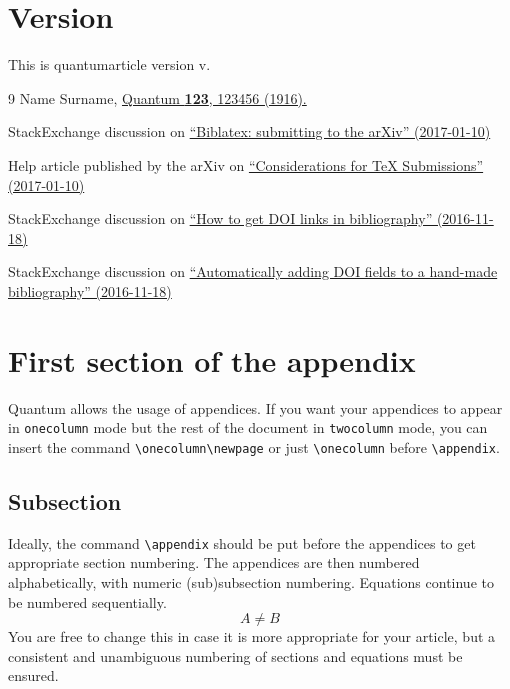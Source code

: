 \documentclass[a4paper,twocolumn,11pt]{quantumarticle}
\begin{document}
\section{Version}
\label{sec:version}
This is quantumarticle version v\quantumarticleversion.


\begin{thebibliography}{9}
  Name Surname,
  \href{https://doi.org/10.22331/
        idonotexist}{Quantum
        \textbf{123}, 123456 (1916).}

  StackExchange discussion on \href{http://tex.stackexchange.com/questions/26990/biblatex-submitting-to-the-arxiv}{``Biblatex: submitting to the arXiv'' (2017-01-10)}

  Help article published by the arXiv on \href{https://arxiv.org/help/submit_tex}{``Considerations for TeX Submissions'' (2017-01-10)}

  StackExchange discussion on \href{http://tex.stackexchange.com/questions/3802/how-to-get-doi-links-in-bibliography}{``How to get DOI links in bibliography'' (2016-11-18)}

  StackExchange discussion on \href{http://tex.stackexchange.com/questions/6810/automatically-adding-doi-fields-to-a-hand-made-bibliography}{``Automatically adding DOI fields to a hand-made bibliography'' (2016-11-18)}
\end{thebibliography}



\onecolumn
\appendix

\section{First section of the appendix}
Quantum allows the usage of appendices.
If you want your appendices to appear in \texttt{onecolumn} mode but the rest of the
document in \texttt{twocolumn} mode, you can insert the command
\texttt{\textbackslash{}onecolumn\textbackslash{}newpage} or just
\texttt{\textbackslash{}onecolumn} before
\texttt{\textbackslash{}appendix}.


\subsection{Subsection}
Ideally, the command \texttt{\textbackslash{}appendix} should be put before the appendices to get appropriate section numbering.
The appendices are then numbered alphabetically, with numeric (sub)subsection numbering.
Equations continue to be numbered sequentially.
\begin{equation}
  A \neq B
\end{equation}
You are free to change this in case it is more appropriate for your article, but a consistent and unambiguous numbering of sections and equations must be ensured.
\end{document}
